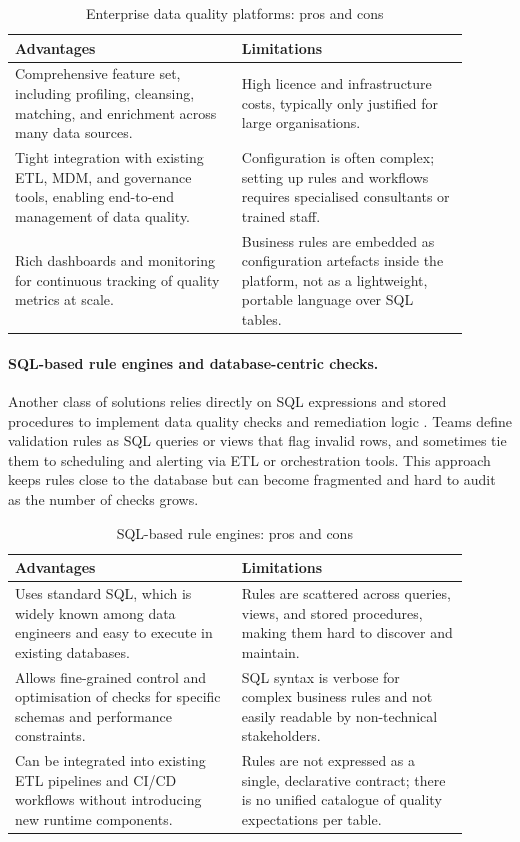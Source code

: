 \begin{table}[h]
\centering
\caption{Enterprise data quality platforms: pros and cons}
\begin{tabular}{|p{0.45\linewidth}| p{0.45\linewidth}|}
\hline
\textbf{Advantages} & \textbf{Limitations} \\
\hline
Comprehensive feature set, including profiling, cleansing, matching, and enrichment across many data sources. &
High licence and infrastructure costs, typically only justified for large organisations. \\
Tight integration with existing ETL, MDM, and governance tools, enabling end-to-end management of data quality. &
Configuration is often complex; setting up rules and workflows requires specialised consultants or trained staff. \\
Rich dashboards and monitoring for continuous tracking of quality metrics at scale. &
Business rules are embedded as configuration artefacts inside the platform, not as a lightweight, portable language over SQL tables. \\
\hline
\end{tabular}
\end{table}

\paragraph{SQL-based rule engines and database-centric checks.}
Another class of solutions relies directly on SQL expressions and stored procedures to implement data quality checks and remediation logic \cite{rahm2000data}. 
Teams define validation rules as SQL queries or views that flag invalid rows, and sometimes tie them to scheduling and alerting via ETL or orchestration tools. 
This approach keeps rules close to the database but can become fragmented and hard to audit as the number of checks grows.

\begin{table}[h]
\centering
\caption{SQL-based rule engines: pros and cons}
\begin{tabular}{|p{0.45\linewidth}| p{0.45\linewidth}|}
\hline
\textbf{Advantages} & \textbf{Limitations} \\
\hline
Uses standard SQL, which is widely known among data engineers and easy to execute in existing databases. &
Rules are scattered across queries, views, and stored procedures, making them hard to discover and maintain. \\
Allows fine-grained control and optimisation of checks for specific schemas and performance constraints. &
SQL syntax is verbose for complex business rules and not easily readable by non-technical stakeholders. \\
Can be integrated into existing ETL pipelines and CI/CD workflows without introducing new runtime components. &
Rules are not expressed as a single, declarative contract; there is no unified catalogue of quality expectations per table. \\
\hline
\end{tabular}
\end{table}

